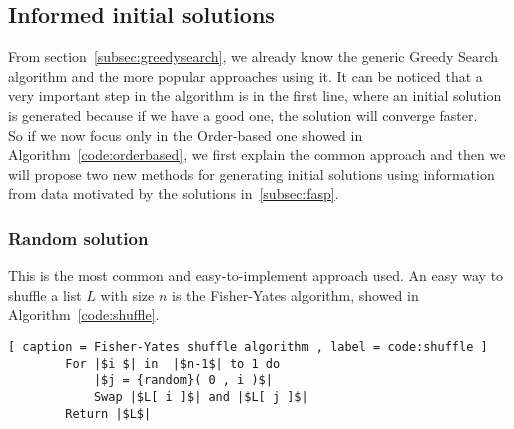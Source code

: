 \subsection{Informed initial solutions}
\label{subsec:solutions}

From section~\ref{subsec:greedysearch}, we already know the generic Greedy Search algorithm and the more popular approaches using it. It can be noticed that a very important step in the algorithm is in the first line, where an initial solution is generated because if we have a good one, the solution will converge faster.\\
So if we now focus only in the Order-based one showed in Algorithm~\ref{code:orderbased}, we first explain the common approach and then we will propose two new methods for generating initial solutions using information from data motivated by the solutions in~\ref{subsec:fasp}.

\subsubsection{Random solution}
\label{subsub:random}
	This is the most common and easy-to-implement approach used. An easy way to shuffle a list $L$ with size $n$ is the Fisher-Yates algorithm, showed in Algorithm~\ref{code:shuffle}.
	\begin{lstlisting}[ caption = Fisher-Yates shuffle algorithm , label = code:shuffle ]
		For |$i $| in  |$n-1$| to 1 do
			|$j = {random}( 0 , i )$|
			Swap |$L[ i ]$| and |$L[ j ]$|
		Return |$L$|
	\end{lstlisting}

